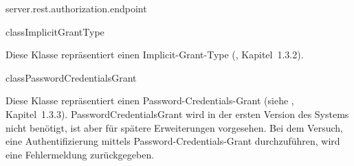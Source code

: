 \begin{texdocpackage}{server.rest.authorization.endpoint}
\begin{texdocclass}{class}{ImplicitGrantType}
\label{texdoclet:edu.kit.informatik.studyplan.server.rest.authorization.endpoint.ImplicitGrantType}
\begin{texdocclassintro}
Diese Klasse repräsentiert einen Implicit-Grant-Type (\cite{rfc6749}, Kapitel~1.3.2).\end{texdocclassintro}
\begin{texdocclassconstructors}
\end{texdocclassconstructors}
\begin{texdocclassmethods}
\end{texdocclassmethods}
\end{texdocclass}


\begin{texdocclass}{class}{PasswordCredentialsGrant}
\label{texdoclet:edu.kit.informatik.studyplan.server.rest.authorization.endpoint.PasswordCredentialsGrant}
\begin{texdocclassintro}
Diese Klasse repräsentiert einen Password-Credentials-Grant  (siehe \cite{rfc6749},  Kapitel~1.3.3).
 PasswordCredentialsGrant wird in der ersten Version des Systems nicht benötigt, ist aber für spätere 
 Erweiterungen vorgesehen.
  Bei dem Versuch, eine Authentifizierung mittels Password-Credentials-Grant durchzuführen, wird eine Fehlermeldung
 zurückgegeben.\end{texdocclassintro}
\begin{texdocclassconstructors}
\end{texdocclassconstructors}
\begin{texdocclassmethods}
\end{texdocclassmethods}
\end{texdocclass}



\end{texdocpackage}
